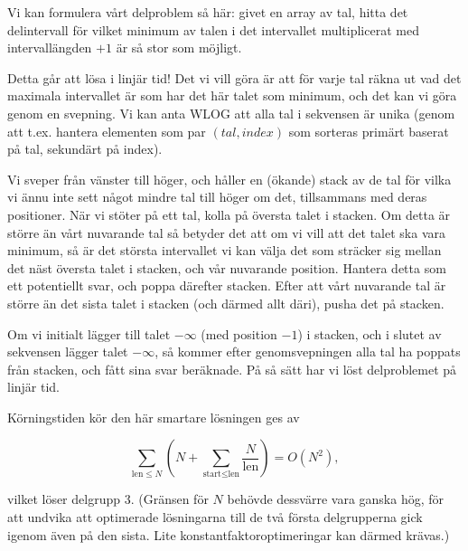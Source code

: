 Vi kan formulera vårt delproblem så här:
givet en array av tal, hitta det delintervall för vilket minimum av talen i det intervallet multiplicerat med intervallängden $+ 1$ är så stor som möjligt.

Detta går att lösa i linjär tid!
Det vi vill göra är att för varje tal räkna ut vad det maximala intervallet är som har det här talet som minimum, och det kan vi göra genom en svepning.
Vi kan anta WLOG att alla tal i sekvensen är unika (genom att t.ex. hantera elementen som par $(tal, index)$ som sorteras primärt baserat på tal, sekundärt på index).

Vi sveper från vänster till höger, och håller en (ökande) stack av de tal för vilka vi ännu inte sett något mindre tal till höger om det, tillsammans med deras positioner.
När vi stöter på ett tal, kolla på översta talet i stacken.
Om detta är större än vårt nuvarande tal så betyder det att om vi vill att det talet ska vara minimum, så är det största intervallet vi kan välja det som sträcker sig mellan
det näst översta talet i stacken, och vår nuvarande position.
Hantera detta som ett potentiellt svar, och poppa därefter stacken.
Efter att vårt nuvarande tal är större än det sista talet i stacken (och därmed allt däri), pusha det på stacken.

Om vi initialt lägger till talet $-\infty$ (med position $-1$) i stacken, och i slutet av sekvensen lägger talet $-\infty$, så kommer efter genomsvepningen alla tal ha poppats från
stacken, och fått sina svar beräknade.
På så sätt har vi löst delproblemet på linjär tid.

Körningstiden kör den här smartare lösningen ges av

\[ \sum_{\text{len} \le N} \left( N + \sum_{\text{start} \le \text{len}}\frac{N}{\text{len}} \right) = O(N^2), \]

vilket löser delgrupp 3.
(Gränsen för $N$ behövde dessvärre vara ganska hög, för att undvika att optimerade lösningarna till de två första delgrupperna gick igenom även på den sista.
Lite konstantfaktoroptimeringar kan därmed krävas.)
